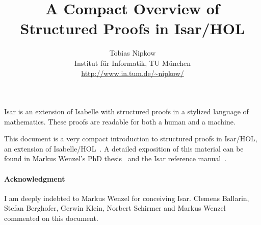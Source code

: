 \documentclass[11pt,a4paper]{article}
\begin{document}
\title{A Compact Overview of Structured Proofs in Isar/HOL}
\author{Tobias Nipkow\\Institut f{\"u}r Informatik, TU M{\"u}nchen\\
 {\small\url{http://www.in.tum.de/~nipkow/}}}
\date{}
\maketitle

\noindent
Isar is an extension of Isabelle with structured proofs in a
stylized language of mathematics. These proofs are readable for both a human
and a machine.

This document is a very compact introduction to structured proofs in
Isar/HOL, an extension of Isabelle/HOL~\cite{LNCS2283}. A detailed
exposition of this material can be found in Markus Wenzel's PhD
thesis~\cite{Wenzel-PhD} and the Isar reference manual~\cite{Isar-Ref-Man}.



%


{\small
\paragraph{Acknowledgment}
I am deeply indebted to Markus Wenzel for conceiving Isar. Clemens Ballarin,
Stefan Berghofer,
Gerwin Klein, Norbert Schirmer and Markus Wenzel commented on this document.
}

\begingroup
 \small\raggedright\frenchspacing

\endgroup
\end{document}
